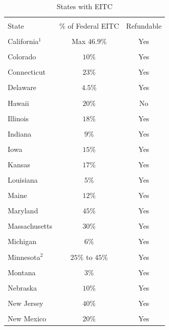 \documentclass{article}
\begin{document}
 \begin{longtable}[h]{lcc}
\caption{States with EITC}\\
 \hline
\\[-1.8ex] 
 State & \% of Federal EITC & Refundable \\ [0.5ex] 
 \hline\hline \\[-1.8ex] 
California$^{1}$ & Max $46.9\%$ & Yes \\
\\[-1.8ex] 
 Colorado & $10\%$ & Yes \\ 
\\[-1.8ex] 
 Connecticut & $23\%$ & Yes \\ 
\\[-1.8ex] 
 Delaware & $4.5\%$ & Yes \\ 
\\[-1.8ex] 
 Hawaii & $20\%$  & No \\ 
\\[-1.8ex] 
 Illinois & $18\%$ & Yes \\
\\[-1.8ex] 
 Indiana & $9\%$ & Yes \\
\\[-1.8ex] 
 Iowa & $15\%$ & Yes \\
\\[-1.8ex] 
 Kansas & $17\%$ & Yes\\ 
\\[-1.8ex] 
 Louisiana & $5\%$ & Yes \\
\\[-1.8ex] 
 Maine & $12\%$ & Yes \\
\\[-1.8ex] 
 Maryland & $45\%$ & Yes\\ 
\\[-1.8ex] 
 Massachusetts & $30\%$ & Yes\\
\\[-1.8ex] 
 Michigan & $6\%$ & Yes \\
\\[-1.8ex] 
 Minnesota$^{2}$ & $25\%$ to $45\%$ & Yes  \\
\\[-1.8ex] 
 Montana & $3\%$ & Yes  \\
\\[-1.8ex] 
 Nebraska & $10\%$ & Yes  \\
\\[-1.8ex] 
 New Jersey & $40\%$ & Yes \\
\\[-1.8ex] 
 New Mexico & $20\%$ & Yes \\

\end{longtable}
\end{document}
